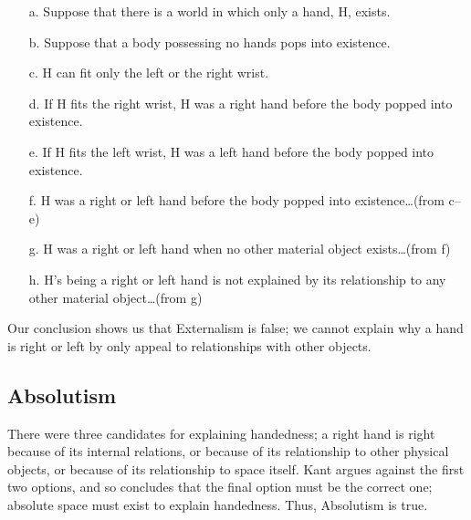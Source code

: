 \documentclass[oneside]{article}
\begin{document}
\begin{enumerate}

\item[a.] 
  Suppose that there is a world in which only a hand, H, exists.
\item[b.]
  Suppose that a body possessing no hands pops into existence.
\item[c.]
  H can fit only the left or the right wrist.
\item[d.]
  If H fits the right wrist, H was a right hand before the body popped
  into existence.
\item[e.]
  If H fits the left wrist, H was a left hand before the body popped
  into existence.
\item[f.]
  H was a right or left hand before the body popped into
  existence\ldots{}(from c--e)
\item[g.]
  H was a right or left hand when no other material object
  exists\ldots{}(from f)
\item[h.]
  H's being a right or left hand is not explained by its relationship to
  any other material object\ldots{}(from g)
\end{enumerate}
Our conclusion shows us that Externalism is false; we cannot explain why a hand is right or left by only appeal to relationships with other objects. 


\subsection*{Absolutism}\label{absolutism}

There were three candidates for explaining handedness; a right hand is right because of its internal relations, or because of its relationship to other physical objects, or because of its relationship to space itself. Kant argues against the first two options, and so concludes that the final option must be the correct one; absolute space must exist to explain handedness. Thus, Absolutism is true. 
\end{document}
